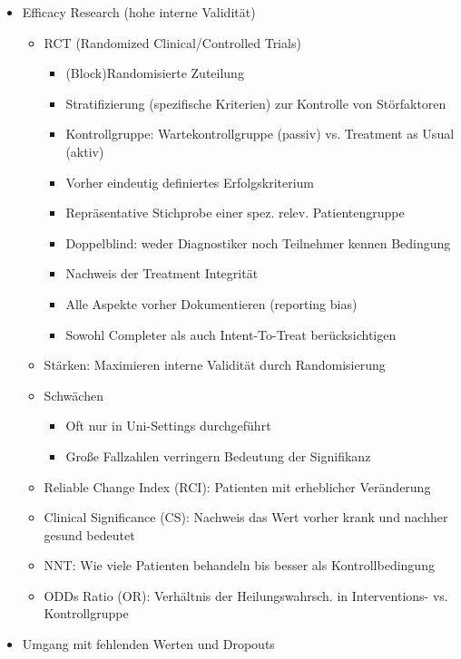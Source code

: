 \documentclass[11pt, paper=a4, twocolumn]{scrartcl}
\begin{document}
\begin{itemize}
\begin{itemize}
				\end{itemize}
			\item Efficacy Research (hohe interne Validität)
				\begin{itemize}
					\item RCT (Randomized Clinical/Controlled Trials)
						\begin{itemize}
							\item (Block)Randomisierte Zuteilung
							\item Stratifizierung (spezifische Kriterien) zur Kontrolle von Störfaktoren
							\item Kontrollgruppe: Wartekontrollgruppe (passiv) vs. Treatment as Usual (aktiv)
							\item Vorher eindeutig definiertes Erfolgskriterium
							\item Repräsentative Stichprobe einer spez. relev. Patientengruppe
							\item Doppelblind: weder Diagnostiker noch Teilnehmer kennen Bedingung
							\item Nachweis der Treatment Integrität
							\item Alle Aspekte vorher Dokumentieren (reporting bias)
							\item Sowohl Completer als auch Intent-To-Treat berücksichtigen
						\end{itemize}
					\item Stärken: Maximieren interne Validität durch Randomisierung
					\item Schwächen
						\begin{itemize}
							\item Oft nur in Uni-Settings durchgeführt
							\item Große Fallzahlen verringern Bedeutung der Signifikanz
						\end{itemize}
					\item Reliable Change Index (RCI): Patienten mit erheblicher Veränderung
					\item Clinical Significance (CS): Nachweis das Wert vorher krank und nachher gesund bedeutet
					\item NNT: Wie viele Patienten behandeln bis besser als Kontrollbedingung
					\item ODDs Ratio (OR): Verhältnis der Heilungswahrsch. in Interventions- vs. Kontrollgruppe
				\end{itemize}
			\item Umgang mit fehlenden Werten und Dropouts
				\begin{itemize}

\end{itemize}
\end{itemize}
\end{document}
